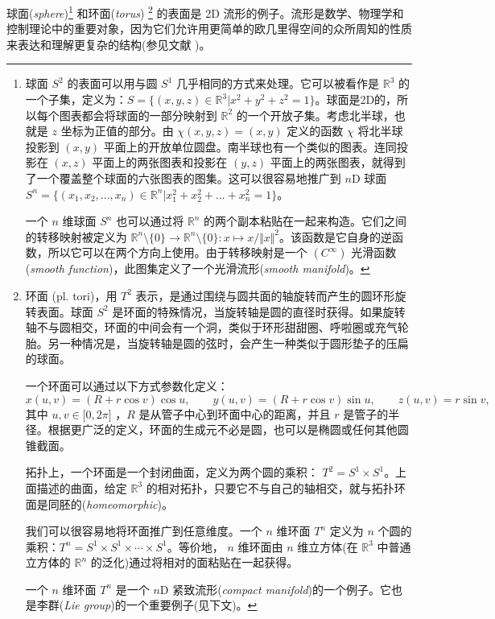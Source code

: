 \documentclass[11pt,fontset=founder]{ctexart}
\begin{document}
球面(\textit{sphere})\footnote{%
球面 $S^{2}$ 的表面可以用与圆 $S^{1}$ 几乎相同的方式来处理。它可以被看作是 $\mathbb{R}^{3}$ 的一个子集，定义为：$S=\{(x,y,z)\in \mathbb{R}^{3}|x^{2}+y^{2}+z^{2}=1\}$。球面是2D的，所以每个图表都会将球面的一部分映射到 $\mathbb{R}^{2}$ 的一个开放子集。考虑北半球，也就是 $z$ 坐标为正值的部分。由 $\chi (x,y,z)=(x,y)$ 定义的函数 $\chi $ 将北半球投影到 $(x,y)$ 平面上的开放单位圆盘。南半球也有一个类似的图表。连同投影在 $(x,z)$ 平面上的两张图表和投影在 $(y,z)$ 平面上的两张图表，就得到了一个覆盖整个球面的六张图表的图集。这可以很容易地推广到 $n$D 球面 $S^{n}=\{(x_{1},x_{2},...,x_{n})\in \mathbb{R}^{n}|x_{1}^{2}+x_{2}^{2}+...+x_{n}^{2}=1\}$。
\par
一个 $n$ 维球面 $S^{n}$ 也可以通过将 $\mathbb{R}^{n}$ 的两个副本粘贴在一起来构造。它们之间的转移映射被定义为 $\mathbb{R}^{n}\setminus \{0\}\rightarrow \mathbb{R}^{n}\setminus \{0\}:x\mapsto x/\Vert x\Vert ^{2}$。该函数是它自身的逆函数，所以它可以在两个方向上使用。由于转移映射是一个 $(C^{\infty })$ 光滑函数(\emph{smooth function})，此图集定义了一个光滑流形(\emph{smooth manifold})。} 和环面(\textit{torus})%
\footnote{%
环面 (pl. tori)，用 $T^{2}$ 表示，是通过围绕与圆共面的轴旋转而产生的圆环形旋转表面。球面 $S^{2}$ 是环面的特殊情况，当旋转轴是圆的直径时获得。如果旋转轴不与圆相交，环面的中间会有一个洞，类似于环形甜甜圈、呼啦圈或充气轮胎。另一种情况是，当旋转轴是圆的弦时，会产生一种类似于圆形垫子的压扁的球面。
\par
一个环面可以通过以下方式参数化定义：
\begin{equation*}
x(u,v)=(R+r\cos {v})\cos {u},\qquad y(u,v)=(R+r\cos {v})\sin {u},\qquad
z(u,v)=r\sin {v},
\end{equation*}
其中 $u,v\in \lbrack 0,2\pi ]$ ，$R$ 是从管子中心到环面中心的距离，并且 $r$ 是管子的半径。根据更广泛的定义，环面的生成元不必是圆，也可以是椭圆或任何其他圆锥截面。
\par
拓扑上，一个环面是一个封闭曲面，定义为两个圆的乘积： $T^{2}=S^{1}\times S^{1}$。上面描述的曲面，给定 $\mathbb{R}^{3}$ 的相对拓扑，只要它不与自己的轴相交，就与拓扑环面是同胚的(\emph{homeomorphic})。
\par
我们可以很容易地将环面推广到任意维度。一个 $n$ 维环面 $T^{n}$ 定义为 $n$ 个圆的乘积：$T^{n}=S^{1}\times S^{1}\times \cdots \times S^{1}$。等价地， $n$ 维环面由 $n$ 维立方体(在 $\mathbb{R}^{3}$ 中普通立方体的 $\mathbb{R}^{n}$ 的泛化)通过将相对的面粘贴在一起获得。
\par
一个 $n$ 维环面 $T^{n}$ 是一个 $n$D 紧致流形(\textit{compact manifold})的一个例子。它也是李群(\textit{Lie group})的一个重要例子(见下文)。} 的表面是 2D 流形的例子。流形是数学、物理学和控制理论中的重要对象，因为它们允许用更简单的欧几里得空间的众所周知的性质来表达和理解更复杂的结构(参见文献 \cite{GaneshADG})。
\end{document}
